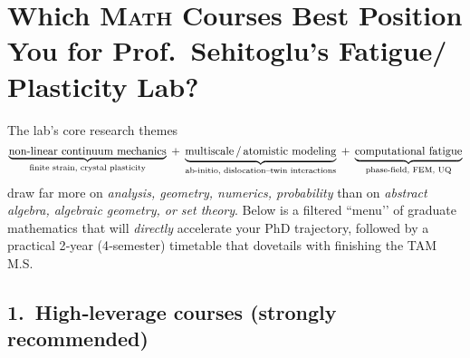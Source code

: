 \documentclass[12pt]{article}
\theoremstyle{definition} %
\theoremstyle{plain} %
\begin{document}
\section*{Which \textsc{Math} Courses Best Position You for
Prof.\ Sehitoglu’s  Fatigue\;/\,Plasticity Lab?}

\noindent
The lab’s core research themes
\[
  \underbrace{\text{non‑linear continuum mechanics}}_{\text{finite strain,
       crystal plasticity}}
  \;+\;
  \underbrace{\text{multiscale\,/\,atomistic modeling}}_{\text{ab‑initio,
       dislocation–twin interactions}}
  \;+\;
  \underbrace{\text{computational fatigue}}_{\text{phase‑field,
       FEM, UQ}}
\]
draw far more on \emph{analysis, geometry, numerics, probability} than on
\emph{abstract algebra, algebraic geometry, or set theory}.  
Below is a filtered “menu’’ of graduate mathematics that will
\emph{directly} accelerate your PhD trajectory, followed by a practical
2‑year (4‑semester) timetable that dovetails with finishing the TAM M.S.

\subsection*{1.\  High‑leverage courses (strongly recommended)}
\end{document}
